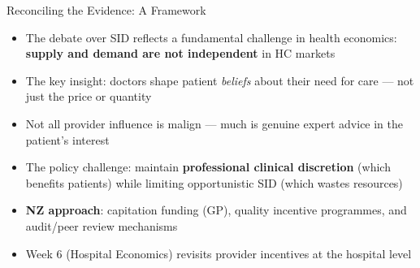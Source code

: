 \documentclass[aspectratio=169, 12pt]{beamer}
\begin{document}
\begin{frame}{Reconciling the Evidence: A Framework}
  \begin{itemize}
    \item The debate over SID reflects a fundamental challenge in health economics:
          \textbf{supply and demand are not independent} in HC markets
    \item The key insight: doctors shape patient \emph{beliefs} about their need for care ---
          not just the price or quantity
    \item Not all provider influence is malign --- much is genuine expert advice in the
          patient's interest
    \item The policy challenge: maintain \textbf{professional clinical discretion} (which
          benefits patients) while limiting opportunistic SID (which wastes resources)
    \item \textbf{NZ approach}: capitation funding (GP), quality incentive programmes,
          and audit/peer review mechanisms
    \item Week 6 (Hospital Economics) revisits provider incentives at the hospital level
  \end{itemize}
\end{frame}

\end{document}
